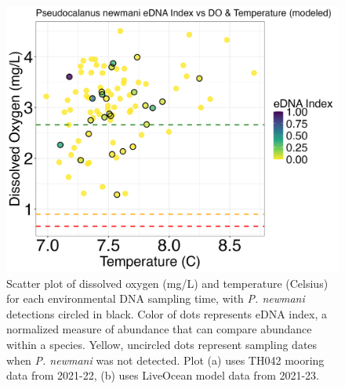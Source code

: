 \documentclass[12pt,twoside]{reedthesis}
\begin{document}
	\begin{figure}[!h]
		\begin{center}
			\includegraphics[scale=0.3]{Pnewmani_Scatter_AllYr_mod_noOut}
			\caption[\textit{P. newmani} scatterplot]{\footnotesize{Scatter plot of dissolved oxygen (mg/L) and temperature (Celsius) for each environmental DNA sampling time, with \textit{P. newmani} detections circled in black. Color of dots represents eDNA index, a normalized measure of abundance that can compare abundance within a species. Yellow, uncircled dots represent sampling dates when \textit{P. newmani} was not detected. Plot (a) uses TH042 mooring data from 2021-22, (b) uses LiveOcean model data from 2021-23.}} %
		\end{center}
		\label{PnewmaniScatter}
	\end{figure} 
	
\end{document}
